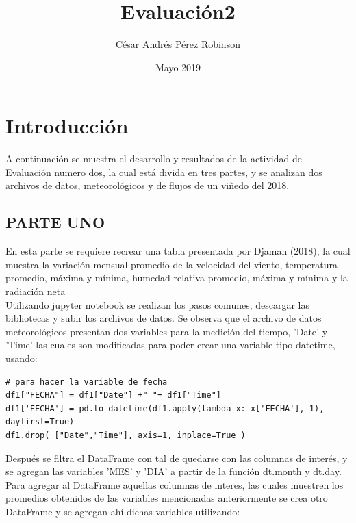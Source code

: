 \documentclass[11pt, spanish]{report}
\title{Evaluación2}
\author{César Andrés Pérez Robinson }
\date{Mayo 2019}
\begin{document}
\maketitle

\section{Introducción}
A continuación se muestra el desarrollo y resultados de la actividad de Evaluación numero dos, la cual está divida en tres partes, y se analizan dos archivos de datos, meteorológicos y de flujos de un viñedo del 2018.
\subsection{PARTE UNO}
En esta parte se requiere recrear una tabla presentada por Djaman (2018), la cual muestra la variación mensual promedio de la velocidad del viento, temperatura promedio, máxima y mínima, humedad relativa promedio, máxima y mínima y la radiación neta \\
Utilizando jupyter notebook se realizan los pasos comunes, descargar las bibliotecas y subir los archivos de datos. Se observa que el archivo de datos meteorológicos presentan dos variables para la medición del tiempo, 'Date' y 'Time' las cuales son modificadas para poder crear una variable tipo datetime, usando:
\begin{verbatim}
# para hacer la variable de fecha
df1["FECHA"] = df1["Date"] +" "+ df1["Time"]
df1['FECHA'] = pd.to_datetime(df1.apply(lambda x: x['FECHA'], 1), dayfirst=True)
df1.drop( ["Date","Time"], axis=1, inplace=True )
\end{verbatim}
Después se filtra el DataFrame con tal de quedarse con las columnas de interés, y se agregan las variables 'MES' y 'DIA' a partir de la función dt.month y dt.day. \\
Para agregar al DataFrame aquellas columnas de interes, las cuales muestren los promedios obtenidos de las variables mencionadas anteriormente se crea otro DataFrame y se agregan ahí dichas variables utilizando:
\end{document}
